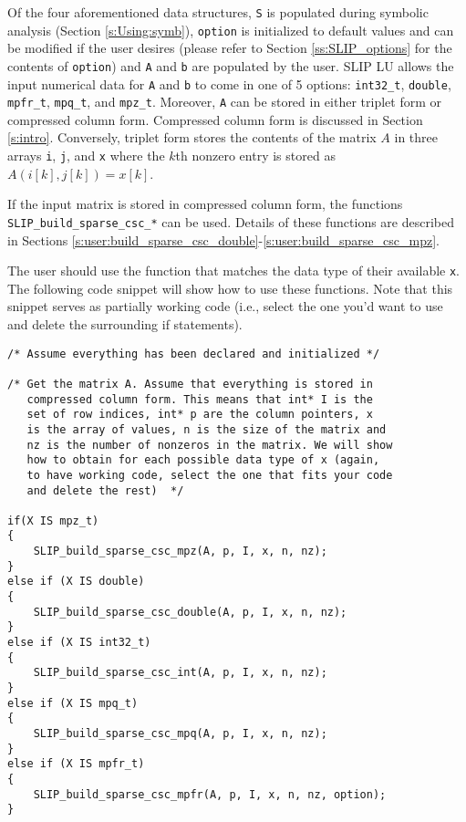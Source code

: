 \documentclass[11pt]{article}
\theoremstyle{definition}
\begin{document}
Of the four aforementioned data structures, \verb|S| is populated during symbolic analysis (Section \ref{s:Using:symb}), \verb|option| is initialized to default values and can be modified if the user desires (please refer to Section \ref{ss:SLIP_options} for the contents of \verb|option|) and \verb|A| and \verb|b| are populated by the user. SLIP LU allows the input numerical data for \verb|A| and \verb|b| to come in one of 5 options: \verb|int32_t|, \verb|double|, \verb|mpfr_t|, \verb|mpq_t|, and \verb|mpz_t|. Moreover, \verb|A| can be stored in either triplet form or compressed column form. Compressed column form is discussed in Section \ref{s:intro}. Conversely, triplet form stores the contents of the matrix $A$ in three arrays \verb|i|, \verb|j|, and \verb|x| where the $k$th nonzero entry is stored as $A ( i[k], j[k]) = x[k]$.


If the input matrix is stored in compressed column form, the functions \verb|SLIP_build_sparse_csc_*| can be used. Details of these functions are described in Sections \ref{s:user:build_sparse_csc_double}-\ref{s:user:build_sparse_csc_mpz}.

The user should use the function that matches the data type of their available \verb|x|. The following code snippet will show how to use these functions. Note that this snippet serves as partially working code (i.e., select the one you'd want to use and delete the surrounding if statements).

\begin{verbatim}
/* Assume everything has been declared and initialized */

/* Get the matrix A. Assume that everything is stored in
   compressed column form. This means that int* I is the
   set of row indices, int* p are the column pointers, x
   is the array of values, n is the size of the matrix and
   nz is the number of nonzeros in the matrix. We will show
   how to obtain for each possible data type of x (again,
   to have working code, select the one that fits your code
   and delete the rest)  */

if(X IS mpz_t)
{
    SLIP_build_sparse_csc_mpz(A, p, I, x, n, nz);
}
else if (X IS double)
{
    SLIP_build_sparse_csc_double(A, p, I, x, n, nz);
}
else if (X IS int32_t)
{
    SLIP_build_sparse_csc_int(A, p, I, x, n, nz);
}
else if (X IS mpq_t)
{
    SLIP_build_sparse_csc_mpq(A, p, I, x, n, nz);
}
else if (X IS mpfr_t)
{
    SLIP_build_sparse_csc_mpfr(A, p, I, x, n, nz, option);
}

\end{verbatim}
\end{document}
